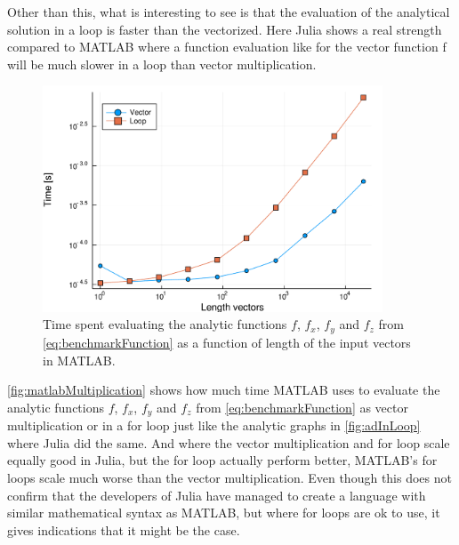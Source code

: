 Other than this, what is interesting to see is that the evaluation of the analytical solution in a loop is faster than the vectorized. Here Julia shows a real strength compared to MATLAB where a function evaluation like for the vector function f will be much slower in a loop than vector multiplication.
\begin{figure}[htb]
    \centering
    \includegraphics[width = 0.9\textwidth]{figures/benchmark_matlab_multiplication.pdf}
    \caption{Time spent evaluating the analytic functions $f$, $f_x$, $f_y$ and $f_z$ from \eqref{eq:benchmarkFunction} as a function of length of the input vectors in MATLAB.}
    \label{fig:matlabMultiplication}
\end{figure}
\autoref{fig:matlabMultiplication} shows how much time MATLAB uses to evaluate the analytic functions $f$, $f_x$, $f_y$ and $f_z$ from \eqref{eq:benchmarkFunction} as vector multiplication or in a for loop just like the analytic graphs in \autoref{fig:adInLoop} where Julia did the same. And where the vector multiplication and for loop scale equally good in Julia, but the for loop actually perform better, MATLAB's for loops scale much worse than the vector multiplication. Even though this does not confirm that the developers of Julia have managed to create a language with similar mathematical syntax as MATLAB, but where for loops are ok to use, it gives indications that it might be the case.

